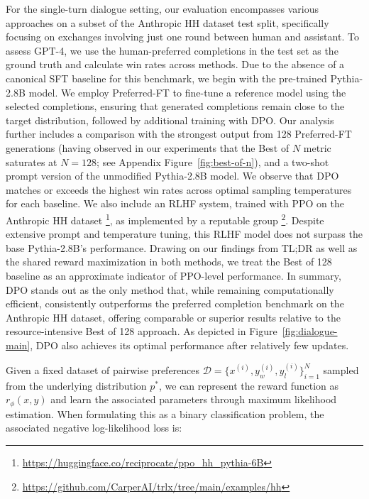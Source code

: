 For the single-turn dialogue setting, our evaluation encompasses various approaches on a subset of the Anthropic HH dataset \citep{bai2022training} test split, specifically focusing on exchanges involving just one round between human and assistant. To assess GPT-4, we use the human-preferred completions in the test set as the ground truth and calculate win rates across methods. Due to the absence of a canonical SFT baseline for this benchmark, we begin with the pre-trained Pythia-2.8B model. We employ Preferred-FT to fine-tune a reference model using the selected completions, ensuring that generated completions remain close to the target distribution, followed by additional training with DPO. Our analysis further includes a comparison with the strongest output from 128 Preferred-FT generations (having observed in our experiments that the Best of $N$ metric saturates at $N=128$; see Appendix Figure~\ref{fig:best-of-n}), and a two-shot prompt version of the unmodified Pythia-2.8B model. We observe that DPO matches or exceeds the highest win rates across optimal sampling temperatures for each baseline. We also include an RLHF system, trained with PPO on the Anthropic HH dataset \footnote{\url{https://huggingface.co/reciprocate/ppo_hh_pythia-6B}}, as implemented by a reputable group \footnote{\url{https://github.com/CarperAI/trlx/tree/main/examples/hh}}. Despite extensive prompt and temperature tuning, this RLHF model does not surpass the base Pythia-2.8B's performance. Drawing on our findings from TL;DR as well as the shared reward maximization in both methods, we treat the Best of 128 baseline as an approximate indicator of PPO-level performance. In summary, DPO stands out as the only method that, while remaining computationally efficient, consistently outperforms the preferred completion benchmark on the Anthropic HH dataset, offering comparable or superior results relative to the resource-intensive Best of 128 approach. As depicted in Figure~\ref{fig:dialogue-main}, DPO also achieves its optimal performance after relatively few updates.

Given a fixed dataset of pairwise preferences $\mathcal{D}=\bigl\{x^{(i)}, y_w^{(i)}, y_l^{(i)}\bigr\}_{i=1}^N$ sampled from the underlying distribution $p^*$, we can represent the reward function as $r_{\phi}(x, y)$ and learn the associated parameters through maximum likelihood estimation. When formulating this as a binary classification problem, the associated negative log-likelihood loss is:

